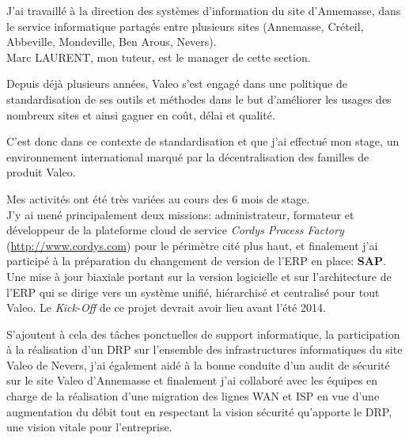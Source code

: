 J'ai travaillé à la direction des systèmes d'information du site d'Annemasse, dans le service informatique partagés entre plusieurs sites (Annemasse, Créteil, Abbeville, Mondeville, Ben Arous, Nevers). \\
Marc LAURENT, mon tuteur, est le manager de cette section.

Depuis déjà plusieurs années, Valeo s'est engagé dans une politique de standardisation de ses outils et méthodes dans le but d'améliorer les usages des nombreux sites et ainsi gagner en coût, délai et qualité.

C'est donc dans ce contexte de standardisation et que j'ai effectué mon stage, un environnement international marqué par la décentralisation des familles de produit Valeo. 

Mes activités ont été très variées au cours des 6 mois de stage. \\
J'y ai mené principalement deux missions: administrateur, formateur et développeur de la plateforme cloud de service \textit{Cordys Process Factory} (\url{http://www.cordys.com})  pour le périmètre cité plus haut, et finalement j'ai participé à la préparation du changement de version de l'ERP en place: \textbf{SAP}. Une mise à jour biaxiale portant sur la version logicielle et sur l'architecture de l'ERP qui se dirige vers un système unifié, hiérarchisé et centralisé pour tout Valeo. Le\textit{ Kick-Off }de ce projet devrait avoir lieu avant l'été 2014.

S'ajoutent à cela des tâches ponctuelles de support informatique, la participation à la réalisation d'un DRP sur l'ensemble des infrastructures informatiques du site Valeo de Nevers, j'ai également aidé à la bonne conduite d'un audit de sécurité sur le site Valeo d'Annemasse et finalement j'ai collaboré avec les équipes en charge de la réalisation d'une migration des lignes WAN et ISP en vue d'une augmentation du débit  tout en respectant la vision sécurité qu'apporte le DRP, une vision vitale pour l'entreprise. 

